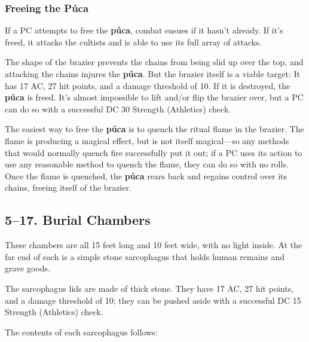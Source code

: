 \documentclass[10pt,a4paper,twoside,bg=print,twocolumn,openany,nodeprecatedcode]{dndbook}
\begin{document}
\subsubsection{Freeing the Púca}
If a PC attempts to free the \textbf{púca}, combat ensues if it hasn't already. If it's freed, it attacks the cultists and is able to use its full array of attacks.

The shape of the brazier prevents the chains from being slid up over the top, and attacking the chains injures the \textbf{púca}. But the brazier itself is a viable target: It has 17 AC, 27 hit points, and a damage threshold of 10. If it is destroyed, the \textbf{púca} is freed. It's almost impossible to lift and/or flip the brazier over, but a PC can do so with a successful DC 30 Strength (Athletics) check.

The easiest way to free the \textbf{púca} is to quench the ritual flame in the brazier. The flame is producing a magical effect, but is not itself magical—so any methods that would normally quench fire successfully put it out; if a PC uses its action to use any reasonable method to quench the flame, they can do so with no rolls. Once the flame is quenched, the \textbf{púca} rears back and regains control over its chains, freeing itself of the brazier.

\subsection{5–17. Burial Chambers}
These chambers are all 15 feet long and 10 feet wide, with no light inside. At the far end of each is a simple stone sarcophagus that holds human remains and grave goods.

The sarcophagus lids are made of thick stone. They have 17 AC, 27 hit points, and a damage threshold of 10; they can be pushed aside with a successful DC 15 Strength (Athletics) check.

The contents of each sarcophagus follows:
\end{document}
